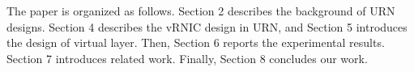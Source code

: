The paper is organized as follows. Section 2 describes the background of URN designs. Section 4 describes the vRNIC design in URN, and Section 5 introduces the design of virtual layer. Then, Section 6 reports the experimental results. Section 7 introduces related work. Finally, Section 8 concludes our work.
